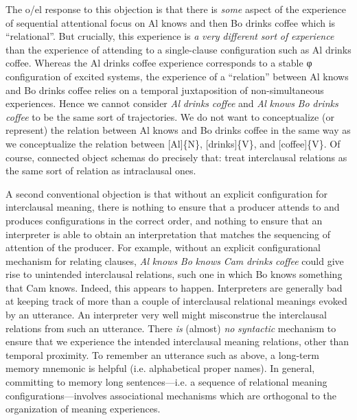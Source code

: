   The o/el response to this objection is that there is \textit{some} aspect of the experience of sequential attentional focus on {\textbar}Al knows{\textbar} and then {\textbar}Bo drinks coffee{\textbar} which is “relational”. But crucially, this experience is \textit{a} \textit{very} \textit{different} \textit{sort} \textit{of} \textit{experience} than the experience of attending to a single-clause configuration such as {\textbar}Al drinks coffee{\textbar}. Whereas the {\textbar}Al drinks coffee{\textbar} experience corresponds to a stable φ configuration of excited systems, the experience of a “relation” between {\textbar}Al knows{\textbar} and {\textbar}Bo drinks coffee{\textbar} relies on a temporal juxtaposition of non-simultaneous experiences. Hence we cannot consider \textit{Al} \textit{drinks} \textit{coffee} and \textit{Al} \textit{knows} \textit{Bo} \textit{drinks} \textit{coffee} to be the same sort of trajectories. We do not want to conceptualize (or represent) the relation between {\textbar}Al knows{\textbar} and {\textbar}Bo drinks coffee{\textbar} in the same way as we conceptualize the relation between [Al]\{N\}, [drinks]\{V\}, and [coffee]\{V\}. Of course, connected object schemas do precisely that: treat interclausal relations as the same sort of relation as intraclausal ones.

  A second conventional objection is that without an explicit configuration for interclausal meaning, there is nothing to ensure that a producer attends to and produces configurations in the correct order, and nothing to ensure that an interpreter is able to obtain an interpretation that matches the sequencing of attention of the producer. For example, without an explicit configurational mechanism for relating clauses, \textit{Al} \textit{knows} \textit{Bo} \textit{knows} \textit{Cam} \textit{drinks} \textit{coffee} could give rise to unintended interclausal relations, such one in which Bo knows something that Cam knows. Indeed, this appears to happen. Interpreters are generally bad at keeping track of more than a couple of interclausal relational meanings evoked by an utterance. An interpreter very well might misconstrue the interclausal relations from such an utterance. There \textit{is} (almost) \textit{no} \textit{syntactic} mechanism to ensure that we experience the intended interclausal meaning relations, other than temporal proximity. To remember an utterance such as above, a long-term memory mnemonic is helpful (i.e. alphabetical proper names). In general, committing to memory long sentences—i.e. a sequence of relational meaning configurations—involves associational mechanisms which are orthogonal to the organization of meaning experiences.

